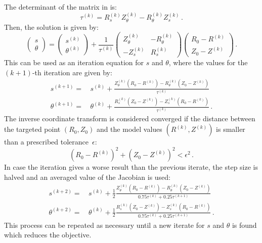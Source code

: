 The determinant of the matrix in  is:
\begin{equation}
 \tau^{(k)} = R^{(k)}_s Z^{(k)}_\theta - R^{(k)}_\theta Z^{(k)}_s \, .
\end{equation}
Then, the solution is given by:
\begin{equation}
 \begin{pmatrix}
         s \\
    \theta
  \end{pmatrix}
  =
 \begin{pmatrix}
         s^{(k)} \\
    \theta^{(k)}
  \end{pmatrix}
  +
  \frac{1}{\tau^{(k)}}
  \begin{pmatrix}
     Z^{(k)}_\theta & -R^{(k)}_\theta \\
    -Z^{(k)}_s      &  R^{(k)}_s
  \end{pmatrix}
  \begin{pmatrix}
    R_0 - R^{(k)} \\
    Z_0 - Z^{(k)}
  \end{pmatrix} \, .
\end{equation}
This can be used as an iteration equation for $s$ and $\theta$,
where the values for the $(k+1)$-th iteration are given by:
\begin{align}
 s^{(k+1)} =&\, s^{(k)} +
   \frac{ Z^{(k)}_\theta \left( R_0 - R^{(k)} \right) -
          R^{(k)}_\theta \left( Z_0 - Z^{(k)} \right) }{\tau^{(k)}} \\
 \theta^{(k+1)} =&\, \theta^{(k)} +
   \frac{ R^{(k)}_s \left( Z_0 - Z^{(k)} \right) -
          Z^{(k)}_s \left( R_0 - R^{(k)} \right) }{\tau^{(k)}} \, .
\end{align}
The inverse coordinate transform is considered converged
if the distance between the targeted point $(R_0, Z_0)$ and the model values $(R^{(k)},Z^{(k)})$
is smaller than a prescribed tolerance~$\epsilon$:
\begin{equation}
 \left( R_0 - R^{(k)} \right)^2 + \left( Z_0 - Z^{(k)} \right)^2 < \epsilon^2 \, .
\end{equation}
In case the iteration gives a worse result than the previous iterate,
the step size is halved
and an averaged value of the Jacobian is used:
\begin{align}
 s^{(k+2)} =&\, s^{(k)} + \frac{1}{2}
   \frac{ Z^{(k)}_\theta \left( R_0 - R^{(k)} \right) -
          R^{(k)}_\theta \left( Z_0 - Z^{(k)} \right) }{0.75 \tau^{(k)} + 0.25 \tau^{(k+1)}} \label{eqn:adaptive_step_s} \\
 \theta^{(k+2)} =&\, \theta^{(k)} + \frac{1}{2}
   \frac{ R^{(k)}_s \left( Z_0 - Z^{(k)} \right) -
          Z^{(k)}_s \left( R_0 - R^{(k)} \right) }{0.75 \tau^{(k)} + 0.25 \tau^{(k+1)}} \label{eqn:adaptive_step_u} \, .
\end{align}
This process can be repeated as necessary
until a new iterate for $s$ and $\theta$ is found
which reduces the objective.

